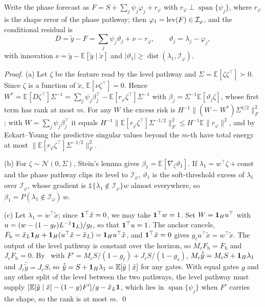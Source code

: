 {Write the phase forecast as $F=S+\sum_j\psi_j\varphi_j+r_\varphi$ with $r_\varphi\perp\operatorname{span}\{\psi_j\}$, where $r_\varphi$ is the shape error of the phase pathway; then $\varphi_1=\operatorname{lev}(F)\in\mathcal I_\varphi$, and the conditional residual is
\begin{equation}
D=\tilde y-F=\textstyle\sum_j\psi_j\vartheta_j+\nu-r_\varphi,\qquad\vartheta_j=\lambda_j-\varphi_j,
\label{eq:dcond}
\end{equation}
with innovation $\nu=\tilde y-\mathbb E[\tilde y\mid\tilde x]$ and $|\vartheta_1|\ge\operatorname{dist}(\lambda_1,\mathcal I_\varphi)$.

\begin{proof}
(a) Let $\zeta$ be the feature read by the level pathway and $\Sigma=\mathbb E[\zeta\zeta^\top]\succ0$. Since $\zeta$ is a function of $\tilde x$, $\mathbb E[\nu\zeta^\top]=0$. Hence $W^*=\mathbb E[D\zeta^\top]\Sigma^{-1}=\sum_j\psi_j\beta_j^\top-\mathbb E[r_\varphi\zeta^\top]\Sigma^{-1}$ with $\beta_j=\Sigma^{-1}\mathbb E[\vartheta_j\zeta]$, whose first term has rank at most $m$. For any $W$ the excess risk is $H^{-1}\|(W-W^*)\Sigma^{1/2}\|_F^2$; with $W=\sum_j\psi_j\beta_j^\top$ it equals $H^{-1}\|\mathbb E[r_\varphi\zeta^\top]\Sigma^{-1/2}\|_F^2\le H^{-1}\mathbb E\|r_\varphi\|^2$, and by Eckart--Young the predictive singular values beyond the $m$-th have total energy at most $\|\mathbb E[r_\varphi\zeta^\top]\Sigma^{-1/2}\|_F^2$.

(b) For $\zeta\sim\mathcal N(0,\Sigma)$, Stein's lemma gives $\beta_1=\mathbb E[\nabla_\zeta\vartheta_1]$. If $\lambda_1=w^\top\zeta+\text{const}$ and the phase pathway clips its level to $\mathcal I_\varphi$, $\vartheta_1$ is the soft-threshold excess of $\lambda_1$ over $\mathcal I_\varphi$, whose gradient is $\mathbb 1\{\lambda_1\notin\mathcal I_\varphi\}w$ almost everywhere, so $\beta_1=P(\lambda_1\notin\mathcal I_\varphi)\,w$.

(c) Let $\lambda_1=w^\top\tilde x$; since $\mathbf 1^\top\tilde x=0$, we may take $\mathbf 1^\top w=1$. Set $W=\mathbf 1_Hu^\top$ with $u=(w-(1-g_\ell)L^{-1}\mathbf 1_L)/g_\ell$, so that $\mathbf 1^\top u=1$. The anchor cancels, $F_{\mathrm b}=\tilde x_L\mathbf 1_H+\mathbf 1_H(u^\top\tilde x-\tilde x_L)=\mathbf 1_Hu^\top\tilde x$, and $\mathbf 1^\top\tilde x=0$ gives $g_\ell u^\top\tilde x=w^\top\tilde x$. The output of the level pathway is constant over the horizon, so $M_cF_{\mathrm b}=F_{\mathrm b}$ and $J_cF_{\mathrm b}=0$. By~ with $F'=M_cS/(1-g_\ell)+J_cS/(1-g_s)$, $M_c\hat{\tilde y}=M_cS+\mathbf 1_H\lambda_1$ and $J_c\hat{\tilde y}=J_cS$, so $\hat{\tilde y}=S+\mathbf 1_H\lambda_1=\mathbb E[\tilde y\mid\tilde x]$ for any gates. With equal gates $g$ and any other split of the level between the two pathways, the level pathway must supply $[\mathbb E[\tilde y\mid\tilde x]-(1-g)F']/g-\tilde x_L\mathbf 1$, which lies in $\operatorname{span}\{\psi_j\}$ when $F'$ carries the shape, so the rank is at most $m$. \qed
\end{proof}

}
